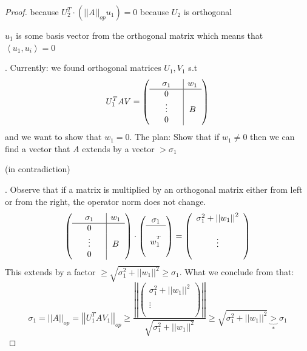 \begin{proof}
because $U_{2}^{T}\cdot\left(\left|\left|A\right|\right|_{op}u_{1}\right)=0$
because $U_{2}$ is orthogonal %
\begin{insight}
$u_{1}$ is some basis vector from the orthogonal matrix which means
that $\left\langle u_{1},u_{i}\right\rangle =0$%
\end{insight}
. Currently: we found orthogonal matrices $U_{1},V_{1}$ s.t 
\[
U_{1}^{T}AV=\left(\begin{array}{ccc|ccc}
 & \sigma_{1} &  & w_{1}\\
\hline  & 0 & \\
 & \vdots &  & B\\
 & 0 & 
\end{array}\right)
\]
 and we want to show that $w_{1}=0$. The plan: Show that if $w_{1}\ne0$
then we can find a vector that $A$ extends by a vector $>\sigma_{1}$
\begin{insight}
(in contradiction)%
\end{insight}
. Observe that if a matrix is multiplied by an orthogonal matrix either
from left or from the right, the operator norm does not change.
\[
\left(\begin{array}{ccc|ccc}
 & \sigma_{1} &  & w_{1}\\
\hline  & 0 & \\
 & \vdots &  & B\\
 & 0 & 
\end{array}\right)\cdot\left(\begin{array}{c}
\sigma_{1}\\
\hline \\
w_{1}^{^{T}}\\
\\
\end{array}\right)=\left(\begin{array}{c}
\sigma_{1}^{2}+\left|\left|w_{1}\right|\right|^{2}\\
\\
\vdots\\
\\
\end{array}\right)
\]
 This extends by a factor $\ge\sqrt{\sigma_{1}^{2}+\left|\left|w_{1}\right|\right|^{2}}\ge\sigma_{1}$.
What we conclude from that: 
\[
\sigma_{1}=\left|\left|A\right|\right|_{op}=\left|\left|U_{1}^{T}AV_{1}\right|\right|_{op}\ge\frac{\left|\left|\left(\begin{array}{c}
\sigma_{1}^{2}+\left|\left|w_{1}\right|\right|^{2}\\
\\
\vdots\\
\\
\end{array}\right)\right|\right|}{\sqrt{\sigma_{1}^{2}+\left|\left|w_{1}\right|\right|^{2}}}\ge\sqrt{\sigma_{1}^{2}+\left|\left|w_{1}\right|\right|^{2}}\underbrace{>}_{\text{*}}\sigma_{1}
\]
\end{proof}
